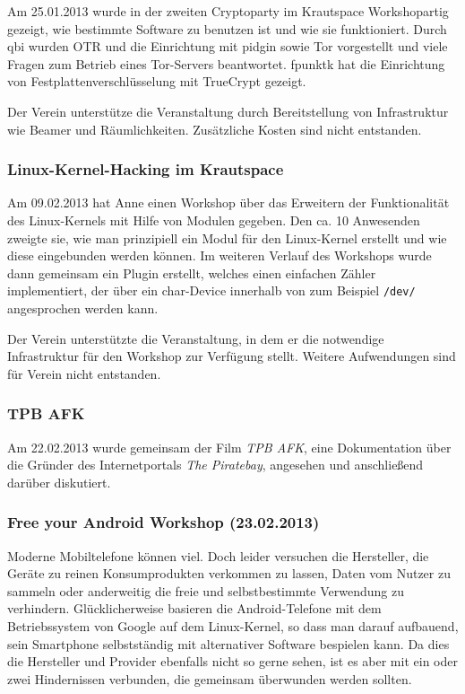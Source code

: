 \documentclass[10pt,DIV16]{scrartcl}
\begin{document}
Am 25.01.2013 wurde in der zweiten Cryptoparty im Krautspace 
Workshopartig gezeigt, wie bestimmte Software zu benutzen ist und wie 
sie funktioniert. Durch qbi wurden OTR und die Einrichtung mit pidgin 
sowie Tor vorgestellt und viele Fragen zum Betrieb eines Tor-Servers 
beantwortet. fpunktk hat die Einrichtung von Festplattenverschlüsselung 
mit TrueCrypt gezeigt. 

Der Verein unterstütze die Veranstaltung durch Bereitstellung von 
Infrastruktur wie Beamer und Räumlichkeiten. Zusätzliche Kosten sind 
nicht entstanden.

\subsubsection{Linux-Kernel-Hacking im Krautspace}

Am 09.02.2013 hat Anne einen Workshop über das Erweitern der 
Funktionalität des Linux-Kernels mit Hilfe von Modulen gegeben. Den ca. 
10 Anwesenden zweigte sie, wie man prinzipiell ein Modul für den 
Linux-Kernel erstellt und wie diese eingebunden werden können. Im 
weiteren Verlauf des Workshops wurde dann gemeinsam ein Plugin 
erstellt, welches einen einfachen Zähler implementiert, der über ein 
char-Device innerhalb von zum Beispiel \texttt{/dev/} angesprochen 
werden kann.

Der Verein unterstützte die Veranstaltung, in dem er die notwendige
Infrastruktur für den Workshop zur Verfügung stellt. Weitere
Aufwendungen sind für Verein nicht entstanden.


\subsubsection{TPB AFK}

Am 22.02.2013 wurde gemeinsam der Film \textit{TPB AFK}, eine 
Dokumentation über die Gründer des Internetportals \textit {The 
Piratebay}, angesehen und anschließend darüber diskutiert.


\subsubsection{Free your Android Workshop (23.02.2013)}
\label{sec:free-your-android}

Moderne Mobiltelefone können viel. Doch leider versuchen die Hersteller,
die Geräte zu reinen Konsumprodukten verkommen zu lassen, Daten vom
Nutzer zu sammeln oder anderweitig die freie und selbstbestimmte
Verwendung zu verhindern. Glücklicherweise basieren die
Android-Telefone mit dem Betriebssystem von Google auf dem
Linux-Kernel, so dass man darauf aufbauend, sein Smartphone
selbstständig mit alternativer Software bespielen kann. Da dies die
Hersteller und Provider ebenfalls nicht so gerne sehen, ist es
aber mit ein oder zwei Hindernissen verbunden, die gemeinsam
überwunden werden sollten.
\end{document}
